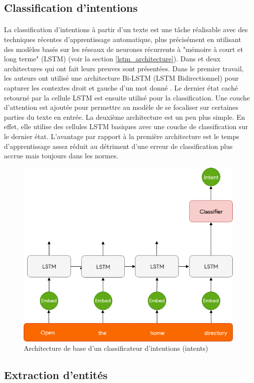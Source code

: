 \subsection{Classification d'intentions}
\paragraph{}
La classification d'intentions à partir d'un texte est une tâche réalisable avec des techniques récentes d'apprentissage automatique, plus précisément en utilisant des modèles basés sur les réseaux de neurones récurrents à "mémoire à court et long terme" (LSTM) (voir la section \ref{lstm_architecture}). Dans \citep{intent_classification} et \citep{intent_slots} deux architectures qui ont fait leurs preuves sont présentées. Dans le premier travail, les auteurs ont utilisé une architecture Bi-LSTM (LSTM Bidirectionnel) pour capturer les contextes droit et gauche d'un mot donné \citep{blstm}. Le dernier état caché retourné par la cellule LSTM est ensuite utilisé pour la classification. Une couche d'attention est ajoutée \citep{attention_mechanism} pour permettre au modèle de se focaliser sur certaines parties du texte en entrée. La deuxième architecture est un peu plus simple. En effet, elle utilise des cellules LSTM basiques avec une couche de classification sur le dernier état. L'avantage par rapport à la première architecture est le temps d'apprentissage assez réduit au détriment d'une erreur de classification plus accrue mais toujours dans les normes.
\begin{figure}[H]
	\centering
	\label{LSTM_intent}
	\includegraphics[width=0.65\linewidth]{images/NLU/intent_classification.png}
	\caption{Architecture de base d'un classificateur d'intentions (intents) \citep{intent_classification}}
\end{figure}
\subsection{Extraction d'entités}
